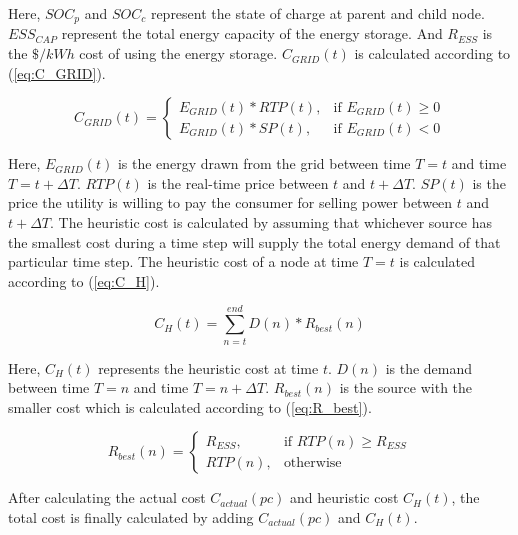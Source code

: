 Here, $SOC_p$ and $SOC_c$ represent the state of charge at parent and child node. $ESS_{CAP}$ represent the total energy capacity of the energy storage. And $R_{ESS}$ is the $\$/kWh$ cost of using the energy storage. $C_{GRID}(t)$ is calculated according to (\ref{eq:C_GRID}).

\begin{equation}
\label{eq:C_GRID}
C_{GRID}(t) = 
\begin{cases}
   E_{GRID}(t)*RTP(t),& \text{if } E_{GRID}(t)\geq 0\\
    E_{GRID}(t)*SP(t),& \text{if }  E_{GRID}(t) < 0
\end{cases}
\end{equation}

Here, $E_{GRID}(t)$ is the energy drawn from the grid between time $T=t$ and time $T=t+\Delta T$. $RTP(t)$ is the real-time price between $t$ and $t+\Delta T$. $SP(t)$ is the price the utility is willing to pay the consumer for selling power between $t$ and $t+\Delta T$. The heuristic cost is calculated by assuming that whichever source has the smallest cost during a time step will supply the total energy demand of that particular time step. The heuristic cost of a node at time $T = t$ is calculated according to (\ref{eq:C_H}).


\begin{equation}
\label{eq:C_H}
C_H(t) = \sum_{n=t}^{end} D(n)*R_{best}(n)
\end{equation}

Here, $C_H(t)$ represents the heuristic cost at time $t$. $D(n)$ is the demand between time $T = n$ and time $T = n+\Delta T$. $R_{best}(n)$ is the source with the smaller cost which is calculated according to (\ref{eq:R_best}).

\begin{equation}
\label{eq:R_best}
R_{best}(n) = 
\begin{cases}
    R_{ESS},& \text{if } RTP(n)\geq R_{ESS}\\
    RTP(n),              & \text{otherwise}
\end{cases}
\end{equation}

After calculating the actual cost  $C_{actual}(pc)$ and heuristic cost $C_H(t)$, the total cost is finally calculated by adding  $C_{actual}(pc)$ and $C_H(t)$.



